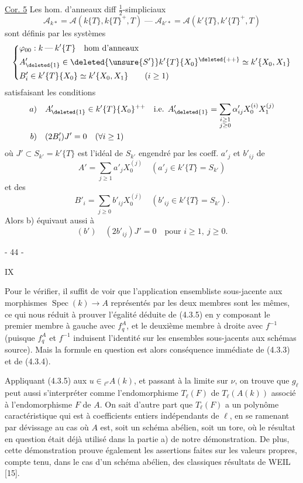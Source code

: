 \uline{Cor. 5} Les hom. d'anneaux diff $\tfrac12$-simpliciaux
\[
 \mathcal A_{k*}=\mathcal A(k\{T\},k\{T\}^+,T)\mathbin{\text{---}}\mathcal A_{k'*}=\mathcal A(k'\{T\},k'\{T\}^+,T)
\]
sont définis par les systèmes 
\[
 \left\{\begin{aligned}
 &\varphi_{00}:k\mathbin{\text{---}}k'\{T\}\quad\text{hom d'anneaux}\\
 &A'_{\deleted{1}}\in\deleted{\unsure{S'}}k'\{T\}\{X_0\}^{\deleted{++}}\simeq k'\{X_0,X_1\}\\
 &B'_i\in k'\{T\}\{X_0\}\simeq k'\{X_0,X_1\}\qquad(i\geq1)
 \end{aligned}\right.
\]
satisfaisant les conditions
\[
 \begin{aligned}
 a)\quad&A'_{\deleted{1}}\in k'\{T\}\{X_0\}^{++}\quad\text{i.e. }A'_{\deleted{1}}=\sum_{\substack{i\geq1\\j\geq0}}\alpha'_{ij}X_0^{(i)}X_1^{(j)}\\
 b)\quad&(2B'_i)J'=0\quad(\forall i\geq1)
 \end{aligned}
\]
où $J'\subset S_{k'}=k'\{T\}$ est l'idéal de $S_{k'}$ engendré par les coeff. $a'_j$ et $b'_{ij}$
de
\[
 A'=\sum_{j\geq1}a'_jX_0^{(j)}\quad(a'_j\in k'\{T\}=S_{k'})
\]
et des
\[
 B'_i=\sum_{j\geq0}b'_{ij}X_0^{(j)}\quad(b'_{ij}\in k'\{T\}=S_{k'}).
\]
Alors b) équivaut aussi à
\[
 (b')\quad(2b'_{ij})J'=0\quad\text{pour }i\geq1,\ j\geq0.
\]
\begin{center}- 44 -\end{center}\hfill IX

Pour le vérifier, il suffit de voir que l'application ensembliste sous-jacente aux morphismes $\operatorname{Spec}(k)\longrightarrow A$ représentés par les deux membres sont les mêmes, ce qui nous réduit à prouver l'égalité déduite de (4.3.5) en y composant le premier membre à gauche avec $f_q^A$, et le deuxième membre à droite avec $f^{-1}$ (puisque $f_q^A$ et $f^{-1}$ induisent l'identité sur les ensembles sous-jacents aux schémas source). Mais la formule en question est alors conséquence immédiate de (4.3.3) et de (4.3.4).

Appliquant (4.3.5) aux $u\in{}_{\ell^\nu}A(k)$, et passant à la limite sur $\nu$, on trouve que $g_\ell$ peut aussi s'interpréter comme l'endomorphisme $T_\ell(F)$ de $T_\ell(A(k))$ associé à l'endomorphisme $F$ de $A$. On sait d'autre part que $T_\ell(F)$ a un polynôme caractéristique qui est à coefficients entiers indépendants de $\ell$, en se ramenant par dévissage au cas où $A$ est, soit un schéma abélien, soit un tore, où le résultat en question était déjà utilisé dans la partie a) de notre démonstration. De plus, cette démonstration prouve également les assertions faites sur les valeurs propres, compte tenu, dans le cas d'un schéma abélien, des classiques résultats de WEIL [15].

